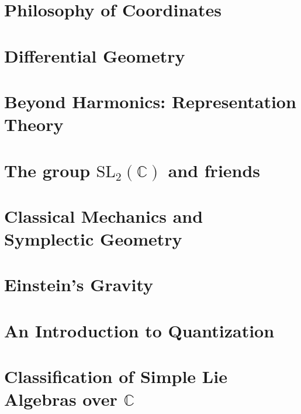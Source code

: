 \documentclass[11pt]{book}
\begin{document}
 
	









\chapter{Philosophy of Coordinates}


\chapter{Differential Geometry}


\chapter{Beyond Harmonics: Representation Theory}


\chapter{The group $\mathrm{SL}_2 (\mathbb{C})$ and friends}

\chapter{Classical Mechanics and Symplectic Geometry}

\chapter{Einstein's Gravity}

\chapter{An Introduction to Quantization}

\chapter{Classification of Simple Lie Algebras over $\mathbb{C}$}



\printindex
\end{document}

